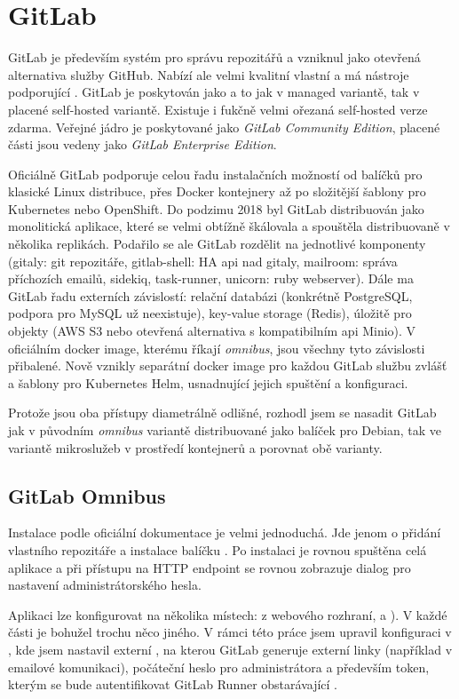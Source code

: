 \section{GitLab}
    GitLab je především systém pro správu repozitářů a vzniknul jako otevřená alternativa služby GitHub. Nabízí ale velmi kvalitní vlastní \CI a má nástroje podporující \CD. GitLab je poskytován jako  a to jak v managed variantě, tak v placené self-hosted variantě. Existuje i fukčně velmi ořezaná self-hosted verze zdarma. Veřejné jádro je poskytované jako \textit{GitLab Community Edition}, placené části jsou vedeny jako \textit{GitLab Enterprise Edition}.

    Oficiálně GitLab podporuje celou řadu instalačních možností od balíčků pro klasické Linux distribuce, přes Docker kontejnery až po složitější šablony pro Kubernetes nebo OpenShift. Do podzimu 2018 byl GitLab distribuován jako monolitická aplikace, které se velmi obtížně škálovala a spouštěla distribuovaně v několika replikách. Podařilo se ale GitLab rozdělit na jednotlivé komponenty (gitaly: git repozitáře, gitlab-shell: HA api nad gitaly, mailroom: správa příchozích emailů, sidekiq, task-runner, unicorn: ruby webserver). Dále ma GitLab řadu externích závislostí: relační databázi (konkrétně PostgreSQL, podpora pro MySQL už neexistuje), key-value storage (Redis), úložitě pro objekty (AWS S3 nebo otevřená alternativa s kompatibilním api Minio). V oficiálním docker image, kterému říkají \textit{omnibus}, jsou všechny tyto závislosti přibalené. Nově vznikly separátní docker image pro každou GitLab službu zvlášť a šablony pro Kubernetes Helm, usnadnující jejich spuštění a konfiguraci.

    Protože jsou oba přístupy diametrálně odlišné, rozhodl jsem se nasadit GitLab jak v původním \textit{omnibus} variantě distribuované jako balíček pro Debian, tak ve variantě mikroslužeb v prostředí kontejnerů a porovnat obě varianty.

    \subsection{GitLab Omnibus}
        Instalace podle oficiální dokumentace je velmi jednoduchá. Jde jenom o přidání vlastního repozitáře a instalace balíčku \cite{gitlab-install-ubuntu}. Po instalaci je rovnou spuštěna celá aplikace a při přístupu na HTTP endpoint se rovnou zobrazuje dialog pro nastavení administrátorského hesla.

        Aplikaci lze konfigurovat na několika místech: z webového rozhraní,  a ). V každé části je bohužel trochu něco jiného. V rámci této práce jsem upravil konfiguraci v , kde jsem nastavil externí , na kterou GitLab generuje externí linky (například v emailové komunikaci), počáteční heslo pro administrátora a především token, kterým se bude autentifikovat GitLab Runner obstarávající \CI.

